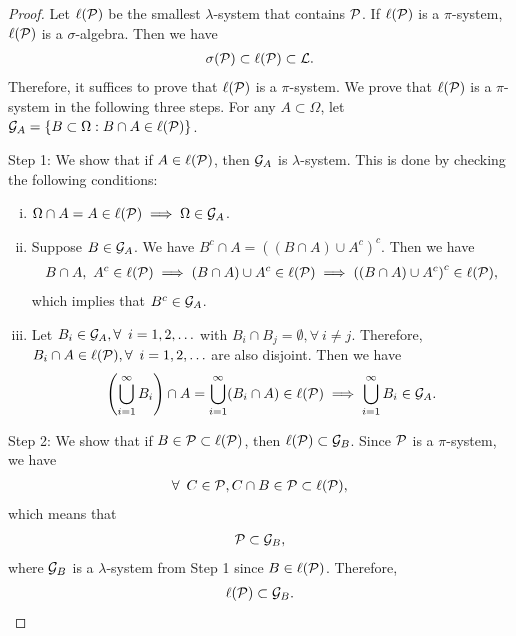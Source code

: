 \documentclass[12pt]{article}
\begin{document}
\begin{proof}
Let $\ell(\mathcal{P})$ be the smallest $\lambda$-system that contains $\mathcal{P}$. If $\ell(\mathcal{P})$ is a $\pi$-system, $\ell(\mathcal{P})$ is a $\sigma$-algebra. Then we have
\begin{align*}
\sigma(\mathcal{P}) \subset \ell(\mathcal{P}) \subset \mathcal{L}.
\end{align*}
Therefore, it suffices to prove that $\ell(\mathcal{P})$ is a $\pi$-system. We prove that $\ell(\mathcal{P})$ is a $\pi$-system in the following three steps. For any $A \subset \Omega$, let $\mathcal{G}_A = \{B \subset \Omega : B \cap A \in \ell(\mathcal{P}) \}$.

Step 1:  We show that if $A \in \ell(\mathcal{P})$, then $\mathcal{G}_A$ is $\lambda$-system. This is done by checking the following conditions:
\begin{enumerate}[(i)]
\item $\Omega \cap A = A \in \ell(\mathcal{P}) \implies \Omega \in \mathcal{G}_A$.
\item Suppose $B \in \mathcal{G}_A$. We have $B^c \cap A = \left( \left(B \cap A \right) \cup {A^c} \right)^c$. Then we have
\begin{align*}
B \cap A,\ A^c \in  \ell(\mathcal{P}) \implies \left(B \cap A \right) \cup {A^c} \in \ell(\mathcal{P}) \implies \left( \left(B \cap A \right) \cup {A^c} \right)^c \in \ell(\mathcal{P}),
\end{align*}
which implies that $B^c \in \mathcal{G}_A$.
\item Let $B_i \in \calG_A, \forall\ i = 1, 2, \ldots$ with $B_i \cap B_j = \emptyset, \forall\ i \neq j$. Therefore, $B_i \cap A \in \ell(\calP), \forall\ i = 1, 2, \ldots$ are also disjoint. Then we have
\begin{align*}
\left(\bigcup\limits_{i=1}^{\infty} B_i\right) \cap A = \bigcup\limits_{i=1}^{\infty} (B_i \cap A ) \in \ell(\mathcal{P}) \implies \bigcup\limits_{i=1}^{\infty} B_i \in \mathcal{G}_A.
\end{align*}
\end{enumerate}

Step 2: We show that if $B \in \mathcal{P} \subset \ell(\mathcal{P})$, then $\ell(\mathcal{P}) \subset \mathcal{G}_B$. Since $\mathcal{P}$ is a $\pi$-system, we have
\begin{align*}
\forall\ C \in \calP, C \cap B \in \calP \subset \ell(\calP),
\end{align*}
which means that 
\begin{align*}
\mathcal{P} \subset \mathcal{G}_B,
\end{align*}
where $\mathcal{G}_B$ is a $\lambda$-system from Step 1 since $B \in \ell(\mathcal{P})$. Therefore, 
\begin{align} \label{Thm:interm_result2}
\ell(\mathcal{P}) \subset \mathcal{G}_B. 
\end{align}


\end{proof}
\end{document}
